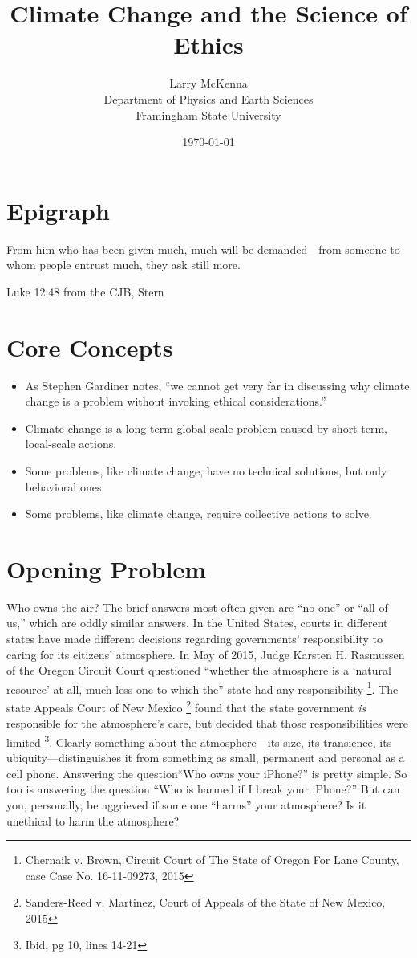 \documentclass[amstex,12pt]{book}
\begin{document}
\title{Climate Change and the Science of Ethics} \label{The Ethics of Climate Change}
\date{\today}
\author{Larry McKenna\\Department of Physics and Earth Sciences\\Framingham State University}
\maketitle
\section*{Epigraph}\label{Epigraph}
\epigraph{From him who has been given much, much will be demanded---from someone to whom people entrust much, they ask still more.}{Luke 12:48 from the CJB, Stern} 

\section{Core Concepts} \label{Core Concepts}
\begin{itemize}
	\item	As Stephen Gardiner notes, ``we cannot get very far in discussing why climate change is a problem without invoking ethical considerations.''
	\item	Climate change is a long-term global-scale problem caused by short-term, local-scale actions. 
	\item	Some problems, like climate change, have no technical solutions, but only behavioral ones
	\item	Some problems, like climate change, require collective actions to solve. 
\end{itemize}

\section{Opening Problem} \label{Who owns the air?}
Who owns the air? The brief answers most often given are ``no one'' or ``all of us,'' which are oddly similar answers. In the United States, courts in different states have made different decisions regarding  governments' responsibility to caring for its citizens' atmosphere. In May of 2015, Judge Karsten H. Rasmussen of the Oregon Circuit Court questioned
``whether the atmosphere is a `natural resource' at all, much less one to which the'' state had any responsibility \footnote{Chernaik v. Brown, Circuit Court of The State of Oregon For Lane County, case Case No. 16-11-09273, 2015}. The state Appeals Court of New Mexico \footnote{Sanders-Reed v. Martinez, Court of Appeals of the State of New Mexico, 2015} found that the state government \emph{is} responsible for the atmosphere's care, but decided that those responsibilities were limited \footnote{Ibid, pg 10, lines 14-21}. Clearly something about the atmosphere---its size, its transience, its ubiquity---distinguishes it from something as small, permanent and personal as a cell phone. Answering the question``Who owns your iPhone?'' is pretty simple. So too is answering the question ``Who is harmed if I break your iPhone?'' But can you, personally, be aggrieved if some one ``harms'' your atmosphere? Is it unethical to harm the atmosphere?
 
\end{document}
